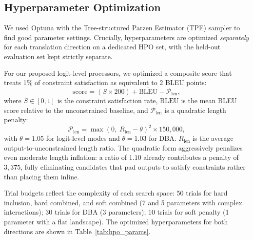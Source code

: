 \documentclass[conference]{IEEEtran}
\begin{document}
\subsection{Hyperparameter Optimization}

We used Optuna \cite{akiba2019optuna} with the Tree-structured Parzen Estimator (TPE) sampler to find good parameter settings. Crucially, hyperparameters are optimized \emph{separately} for each translation direction on a dedicated HPO set, with the held-out evaluation set kept strictly separate.

For our proposed logit-level processors, we optimized a composite score that treats 1\% of constraint satisfaction as equivalent to 2 BLEU points:
\begin{equation}
    \text{score} = (S \times 200) + \overline{\text{BLEU}} - \mathcal{P}_{\text{len}},
    \label{eq:obj}
\end{equation}
where $S \in [0, 1]$ is the constraint satisfaction rate, $\overline{\text{BLEU}}$ is the mean BLEU score relative to the unconstrained baseline, and $\mathcal{P}_{\text{len}}$ is a quadratic length penalty:
\begin{equation}
    \mathcal{P}_{\text{len}} = \max(0,\; R_{\text{len}} - \theta)^2 \times 150{,}000,
    \label{eq:lenpen}
\end{equation}
with $\theta = 1.05$ for logit-level modes and $\theta = 1.03$ for DBA. $R_{\text{len}}$ is the average output-to-unconstrained length ratio. The quadratic form aggressively penalizes even moderate length inflation: a ratio of $1.10$ already contributes a penalty of $3{,}375$, fully eliminating candidates that pad outputs to satisfy constraints rather than placing them inline.

Trial budgets reflect the complexity of each search space: 50 trials for hard inclusion, hard combined, and soft combined (7 and 5 parameters with complex interactions); 30 trials for DBA (3 parameters); 10 trials for soft penalty (1 parameter with a flat landscape). The optimized hyperparameters for both directions are shown in Table~\ref{tab:hpo_params}.
\end{document}
